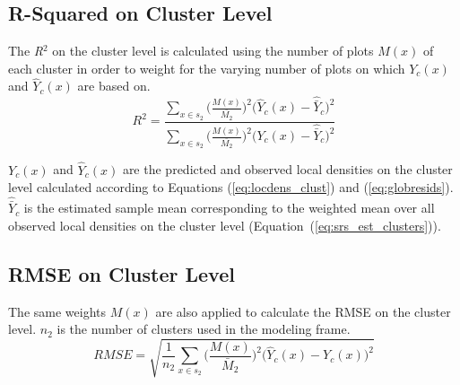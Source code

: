\documentclass[remotesensing,article,accept,moreauthors,pdftex,10pt,a4paper]{Definitions/mdpi}
\begin{document}
%


\appendix

\section{}
\vspace{-6pt}
\subsection{R-Squared on Cluster Level}

The \emph{R}$^2$ on the cluster level is calculated using the number of plots $M(x)$ of each cluster in order to weight for the varying number of plots on which $Y_c(x)$ and $\hat{Y}_{c}(x)$ are based on. 
\begin{equation*}\label{eq:R_squared_clust}
R^2  =   \frac{\sum_{x \in s_2} \Big(\frac{M(x)}{\bar{M_2}}\Big)^2 \Big(\hat{Y}_{c}(x)-\hat{\bar{Y}}_c\Big)^2}{\sum_{x \in s_2} \Big(\frac{M(x)}{\bar{M_2}}\Big)^2 \Big(Y_{c}(x)-\hat{\bar{Y}}_c\Big)^2}
\end{equation*}

 $Y_c(x)$ and $\hat{Y}_{c}(x)$ are the predicted and observed local densities on the cluster level calculated according to Equations (\ref{eq:locdens_clust}) and (\ref{eq:globresids}). $\hat{\bar{Y}}_c$ is the estimated sample mean corresponding to the weighted mean over all observed local densities on the cluster level (Equation~(\ref{eq:srs_est_clusters})).

\subsection{RMSE on Cluster Level}

The same weights $M(x)$ are also applied to calculate the RMSE on the cluster level. $n_2$ is the number of clusters used in the modeling frame.
\begin{equation*}\label{eq:RMSE_clust}
RMSE =  \sqrt{\frac{1}{n_{2}}  \sum_{x \in s_2} \Big(\frac{M(x)}{\bar{M}_2}\Big)^2 \Big(\hat{Y}_{c}(x)-Y_c(x)\Big)^2}
\end{equation*}
\end{document}
